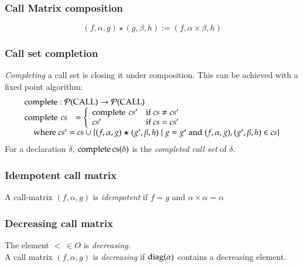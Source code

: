 \subsubsection{Call Matrix composition}
\[(f,\alpha,g) \star (g,\beta,h) := (f,\alpha \times \beta,h)\]


\subsubsection{Call set completion}
\emph{Completing} a call set is closing it under composition.
This can be achieved with a fixed point algorithm:
\[
\begin{array}[t]{ll}
\multicolumn{2}{l}{\complete : \pset{\call} \ra \pset{\call}}\\ 
\complete \: cs  & = \left\{ \begin{array}{ll} 
    \complete \: cs' & \mbox{if } cs \neq cs'\\
     cs' & \mbox{if } cs = cs'  
     \end{array}\right.\\
\multicolumn{2}{l}{\spc \mbox { where } cs' = cs \cup \{ (f,\alpha,g) \star (g',\beta,h) \mid g = g' \mbox{ and } (f,\alpha,g) , (g',\beta,h) \in cs \}} \\
\end{array}
\]
\noindent For a declaration $\delta$,  $\operatorname{complete} \operatorname{cs} (\delta)$ is the \emph{completed call set} of $\delta$.

\subsubsection{Idempotent call matrix}
A call-matrix $(f,\alpha,g)$ is \emph{idempotent} if $ f = g $ and $ \alpha \times \alpha = \alpha $ 

\subsubsection{Decreasing call matrix}
The element $< \: \in O$ is \emph{decreasing}.\\
A call matrix $(f,\alpha,g)$ is \emph{decreasing} if $\operatorname{diag}(\alpha)$ contains a decreasing element.


